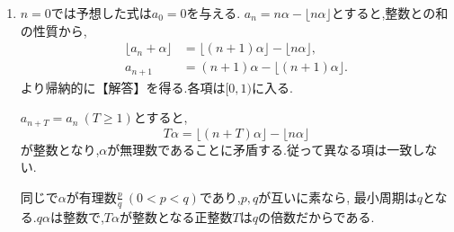 \noindent {}\par\nobreak
\begin{enumerate}[label=(\arabic*),parsep=3pt,beginpenalty=10000,format=\bookitemlink{example-gauss-role-9}{solution}{problem}]
  \item $n=0$では予想した式は$a_0=0$を与える.
    $a_n=n\alpha-\lfloor n\alpha\rfloor$とすると,整数との和の性質から,
    \begin{align*}
      \lfloor a_n+\alpha\rfloor
      &=\lfloor(n+1)\alpha\rfloor-\lfloor n\alpha\rfloor,\\
      a_{n+1}
      &=(n+1)\alpha-\lfloor(n+1)\alpha\rfloor.
    \end{align*}
    より帰納的に【解答】を得る.各項は$[0,1)$に入る.

    $a_{n+T}=a_n\ (T\ge1)$とすると,
    \[
      T\alpha=\lfloor(n+T)\alpha\rfloor-\lfloor n\alpha\rfloor
    \]
    が整数となり,$\alpha$が無理数であることに矛盾する.従って異なる項は一致しない.

    同じで$\alpha$が有理数$\frac pq\ (0<p<q)$であり,$p,q$が互いに素なら,
    最小周期は$q$となる.$q\alpha$は整数で,$T\alpha$が整数となる正整数$T$は$q$の倍数だからである.
\end{enumerate}

